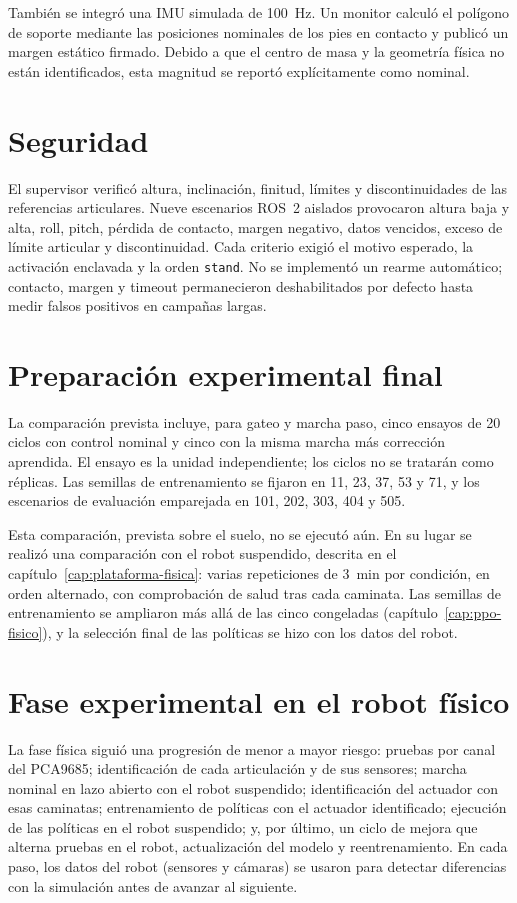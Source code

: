 También se integró una IMU simulada de 100~Hz. Un monitor calculó el polígono de
soporte mediante las posiciones nominales de los pies en contacto y publicó un
margen estático firmado. Debido a que el centro de masa y la geometría física
no están identificados, esta magnitud se reportó explícitamente como nominal.

\section{Seguridad}

El supervisor verificó altura, inclinación, finitud, límites y discontinuidades
de las referencias articulares. Nueve escenarios ROS~2 aislados provocaron
altura baja y alta, roll, pitch, pérdida de contacto, margen negativo, datos
vencidos, exceso de límite articular y discontinuidad. Cada criterio exigió el
motivo esperado, la activación enclavada y la orden \texttt{stand}. No se
implementó un rearme automático; contacto, margen y timeout permanecieron
deshabilitados por defecto hasta medir falsos positivos en campañas largas.

\section{Preparación experimental final}

La comparación prevista incluye, para gateo y marcha paso, cinco ensayos de 20
ciclos con control nominal y cinco con la misma marcha más corrección aprendida.
El ensayo es la unidad independiente; los ciclos no se tratarán como réplicas.
Las semillas de entrenamiento se fijaron en 11, 23, 37, 53 y 71, y los
escenarios de evaluación emparejada en 101, 202, 303, 404 y 505.

Esta comparación, prevista sobre el suelo, no se ejecutó aún. En su lugar se
realizó una comparación con el robot suspendido, descrita en el
capítulo~\ref{cap:plataforma-fisica}: varias repeticiones de 3~min por
condición, en orden alternado, con comprobación de salud tras cada caminata. Las
semillas de entrenamiento se ampliaron más allá de las cinco congeladas
(capítulo~\ref{cap:ppo-fisico}), y la selección final de las políticas se
hizo con los datos del robot.

\section{Fase experimental en el robot físico}

La fase física siguió una progresión de menor a mayor riesgo: pruebas por canal
del PCA9685; identificación de cada articulación y de sus sensores; marcha
nominal en lazo abierto con el robot suspendido; identificación del actuador con
esas caminatas; entrenamiento de políticas con el actuador identificado;
ejecución de las políticas en el robot suspendido; y, por último, un ciclo de
mejora que alterna pruebas en el robot, actualización del modelo y
reentrenamiento. En cada paso, los datos del robot (sensores y cámaras) se usaron
para detectar diferencias con la simulación antes de avanzar al siguiente.
